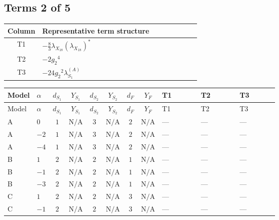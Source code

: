 \documentclass[8pt]{article}
\begin{document}
\begin{landscape}
\subsection*{Terms 2 of 5}
\begin{center}
\begin{tabular}{@{}c >{\raggedright\arraybackslash}p{0.82\linewidth}@{}}
\toprule
Column & Representative term structure \\
\midrule
T1 & \(\displaystyle -\frac{8}{3} {\lambda_{X_{18}}} \left({\lambda_{X_{18}}}\right)^{*}\) \\
\midrule
T2 & \(\displaystyle -2 {g_2}^4\) \\
\midrule
T3 & \(\displaystyle -24 {g_2}^2 {\lambda_{S_1}^{(A)}}\) \\
\midrule
\bottomrule
\end{tabular}
\end{center}
\smallskip
\tiny
\begin{longtable}{@{}llcccccc >{\raggedright\arraybackslash}p{0.21\linewidth} >{\raggedright\arraybackslash}p{0.21\linewidth} >{\raggedright\arraybackslash}p{0.21\linewidth}@{}}
\toprule
Model & $\alpha$ & $d_{S_1}$ & $Y_{S_1}$ & $d_{S_2}$ & $Y_{S_2}$ & $d_F$ & $Y_F$ & T1 & T2 & T3 \\
\midrule
\endfirsthead
\toprule
Model & $\alpha$ & $d_{S_1}$ & $Y_{S_1}$ & $d_{S_2}$ & $Y_{S_2}$ & $d_F$ & $Y_F$ & T1 & T2 & T3 \\
\midrule
\endhead
A & $0$ & $1$ & $\text{N/A}$ & $3$ & $\text{N/A}$ & $2$ & $\text{N/A}$ & --- & --- & --- \\
\midrule
A & $-2$ & $1$ & $\text{N/A}$ & $3$ & $\text{N/A}$ & $2$ & $\text{N/A}$ & --- & --- & --- \\
\midrule
A & $-4$ & $1$ & $\text{N/A}$ & $3$ & $\text{N/A}$ & $2$ & $\text{N/A}$ & --- & --- & --- \\
\midrule
B & $1$ & $2$ & $\text{N/A}$ & $2$ & $\text{N/A}$ & $1$ & $\text{N/A}$ & --- & --- & --- \\
\midrule
B & $-1$ & $2$ & $\text{N/A}$ & $2$ & $\text{N/A}$ & $1$ & $\text{N/A}$ & --- & --- & --- \\
\midrule
B & $-3$ & $2$ & $\text{N/A}$ & $2$ & $\text{N/A}$ & $1$ & $\text{N/A}$ & --- & --- & --- \\
\midrule
C & $1$ & $2$ & $\text{N/A}$ & $2$ & $\text{N/A}$ & $3$ & $\text{N/A}$ & --- & --- & --- \\
\midrule
C & $-1$ & $2$ & $\text{N/A}$ & $2$ & $\text{N/A}$ & $3$ & $\text{N/A}$ & --- & --- & --- \\

\end{longtable}
\end{landscape}
\end{document}

